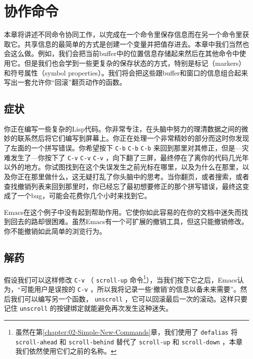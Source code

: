\chapter{协作命令}
\label{chapter:03-Cooperating-Commands}


本章将讲述不同命令协同工作，以完成在一个命令里保存信息而在另一个命令里获取它。共享信息的最简单的方式是创建一个变量并把值存进去。本章中我们当然也会这么做。例如，我们会把当前buffer中的位置信息存储起来然后在其他命令中使用它。但是我们也会学到一些更复杂的保存状态的方式，特别是标记（markers）和符号属性（symbol properties）。我们将会把这些跟buffer和窗口的信息组合起来写出一套允许你“回滚”翻页动作的函数。

\section{症状}
\label{section:03-The-Symptom}

你正在编写一些复杂的Lisp代码。你非常专注，在头脑中努力的理清数据之间的微妙的联系然后将它们编写到屏幕上。你正在处理一个非常精妙的部分而这时你发现了左面的一个拼写错误。你希望按下 \verb|C-b| \verb|C-b| \verb|C-b| 来回到那里对其修正，但是---灾难发生了---你按下了 \verb|C-v| \verb|C-v| \verb|C-v| ，向下翻了三屏，最终停在了离你的代码几光年以外的地方。你试图找到在这个失误发生之前光标在哪里，以及为什么在那里，以及你正在那里做什么，这无疑打乱了你头脑中的思考。当你翻页，或者搜索，或者查找撤销列表来回到那里时，你已经忘了最初想要修正的那个拼写错误，最终这变成了一个bug，可能会花费你几个小时来找到它。

Emacs在这个例子中没有起到帮助作用。它使你如此容易的在你的文档中迷失而找到回去的路却很困难。虽然Emacs有一个可扩展的撤销工具，但这只能撤销修改。你不能撤销如此简单的浏览行为。

\section{解药}
\label{section:03-A-Cure}

假设我们可以这样修改 \verb|C-v| （ \texttt{scroll-up} 命令\footnote{虽然在第\ref{chapter:02-Simple-New-Commands}章，我们使用了 \texttt{defalias} 将 \texttt{scroll-ahead} 和 \texttt{scroll-behind} 替代了 \texttt{scroll-up} 和 \texttt{scroll-down} ，本章我们依然使用它们之前的名称。}），当我们按下它之后，Emacs认为，“可能用户是误按的 \verb|C-v| ，所以我将记录一些‘撤销’的信息以备未来需要”。然后我们可以编写另一个函数， \texttt{unscroll} ，它可以回滚最后一次的滚动。这样只要记住 \texttt{unscroll} 的按键绑定就能避免再次发生这种迷失。

